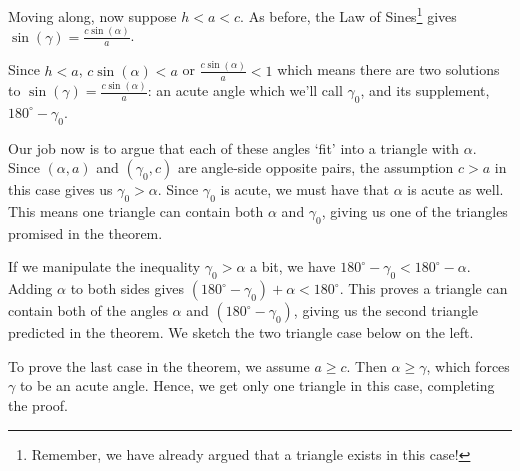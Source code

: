 \documentclass{ximera}
\begin{document}
\begin{image}
\end{image}

 
 
Moving along, now suppose $h < a < c$. As before, the Law of Sines\footnote{Remember, we have already argued that a triangle exists in this case!} gives $\sin(\gamma) = \frac{c \sin(\alpha)}{a}$.  

 

Since $h < a$, $c \sin(\alpha) < a$ or $\frac{c\sin(\alpha)}{a} < 1$  which means there are two solutions to $\sin(\gamma) = \frac{c \sin(\alpha)}{a}$:  an acute angle which we'll call $\gamma_0$, and its supplement, $180^{\circ} - \gamma_0$.   

 

Our job now is to  argue that each of these angles `fit' into a  triangle with $\alpha$.  Since $(\alpha, a)$ and $(\gamma_0,c)$ are angle-side opposite pairs,  the assumption $c > a$ in this case gives us $\gamma_0 > \alpha$. Since $\gamma_0$ is acute, we must have that $\alpha$ is acute as well.  This means one triangle  can contain both $\alpha$ and $\gamma_0$, giving us one of the triangles promised in the theorem.  

 

If we manipulate the inequality $\gamma_0 > \alpha$ a bit, we have  $180^{\circ} - \gamma_0 < 180^{\circ} - \alpha$.  Adding $\alpha$ to both sides gives $\left(180^{\circ} - \gamma_0\right) + \alpha < 180^{\circ}$. This proves a triangle can contain both of the angles $\alpha$ and $\left(180^{\circ} - \gamma_0\right)$, giving us the second triangle predicted in the theorem.  We sketch the two triangle case below on the left.

 

To prove the last case in the theorem, we assume $a \geq c$.  Then $\alpha \geq \gamma$, which forces $\gamma$ to be an acute angle. Hence, we get only one triangle in this case, completing the proof.
 
\end{document}
